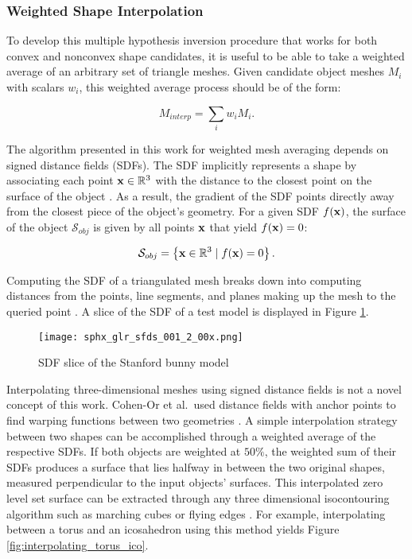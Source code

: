 \subsubsection{Weighted Shape Interpolation}

To develop this multiple hypothesis inversion procedure that works for both convex and nonconvex shape candidates, it is useful to be able to take a weighted average of an arbitrary set of triangle meshes. Given candidate object meshes $M_i$ with scalars $w_i$, this weighted average process should be of the form:

\begin{equation}
  M_{interp} = \sum_{i}{w_i M_i}.
\end{equation}

The algorithm presented in this work for weighted mesh averaging depends on signed distance fields (SDFs). The SDF implicitly represents a shape by associating each point $\mathbf{x} \in \mathbb{R}^3$ with the distance to the closest point on the surface of the object \cite{baerentzen2002}. As a result, the gradient of the SDF points directly away from the closest piece of the object's geometry. For a given SDF $f(\mathbf{x})$, the surface of the object $\mathcal{S}_{obj}$ is given by all points $\mathbf{x}$ that yield $f(\mathbf{x}) = 0$:

\begin{equation} \label{eq:sdf_zero_level_set}
  \mathcal{S}_{obj} = \left\{ \mathbf{x} \in \mathbb{R}^3 \mid f(\mathbf{x}) = 0 \right\}.
\end{equation}

Computing the SDF of a triangulated mesh breaks down into computing distances from the points, line segments, and planes making up the mesh to the queried point \cite{baerentzen2002}. A slice of the SDF of a test model is displayed in Figure \ref{fig:sdf_slice}.

\graphicspath{{/Users/liamrobinson/Documents/PyLightCurves/docs/build/html/_images}}
\begin{figure}[!htb]
  \centering
  \texttt{[image: sphx\_glr\_sfds\_001\_2\_00x.png]}
  \caption{SDF slice of the Stanford bunny model}
  \label{fig:sdf_slice}
\end{figure}

Interpolating three-dimensional meshes using signed distance fields is not a novel concept of this work. Cohen-Or et al.\ used distance fields with anchor points to find warping functions between two geometries \cite{cohen_or1998}. A simple interpolation strategy between two shapes can be accomplished through a weighted average of the respective SDFs. If both objects are weighted at $50\%$, the weighted sum of their SDFs produces a surface that lies halfway in between the two original shapes, measured perpendicular to the input objects' surfaces. This interpolated zero level set surface can be extracted through any three dimensional isocontouring algorithm such as marching cubes \cite{lorensen1987} or flying edges \cite{schroeder2015}. For example, interpolating between a torus and an icosahedron using this method yields Figure \ref{fig:interpolating_torus_ico}. 

